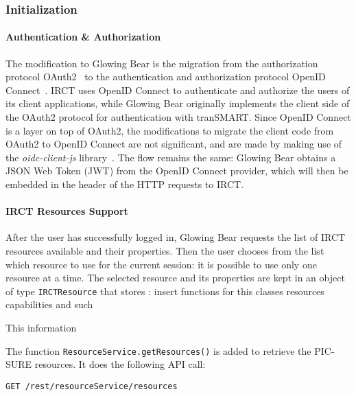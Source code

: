 \subsubsection{Initialization}

\paragraph{Authentication \& Authorization}
The modification to Glowing Bear is the migration from the authorization protocol OAuth2~\cite{oauth2} to the authentication and authorization protocol OpenID Connect~\cite{openidconnect}.
IRCT uses OpenID Connect to authenticate and authorize the users of its client applications, while Glowing Bear originally implements the client side of the OAuth2 protocol for authentication with tranSMART. 
Since OpenID Connect is a layer on top of OAuth2, the modifications to migrate the client code from OAuth2 to OpenID Connect are not significant, and are made by making use of the \emph{oidc-client-js} library~\cite{oidc-client-js}.
The flow remains the same: Glowing Bear obtains a JSON Web Token (JWT) from the OpenID Connect provider, which will then be embedded in the header of the HTTP requests to IRCT.

\paragraph{IRCT Resources Support}

After the user has successfully logged in, Glowing Bear requests the list of IRCT resources available and their properties.
Then the user chooses from the list which resource to use for the current session: it is possible to use only one resource at a time.
The selected resource and its properties are kept in an object of type \verb|IRCTResource| that stores :
insert functions for this classes
resources capabilities and such

This information

The function \verb|ResourceService.getResources()| is added to retrieve the PIC-SURE resources. 
It does the following API call:
\begin{verbatim}
GET /rest/resourceService/resources
\end{verbatim}

